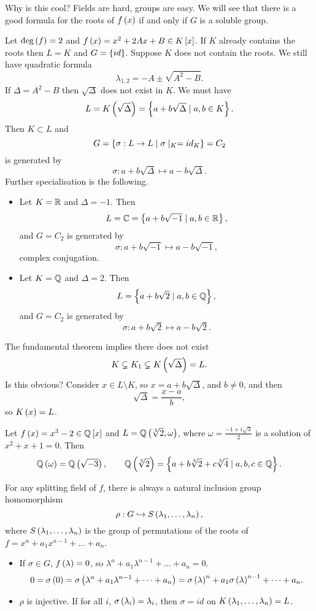 Why is this cool? Fields are hard, groups are easy. We will see that there is a good formula for the roots of $ f\left( x \right) $ if and only if $ G $ is a soluble group.


\begin{example*}
Let $ \deg\left( f \right) = 2 $ and $ f\left( x \right) = x^2 + 2Ax + B \in K\left[ x \right] $. If $ K $ already contains the roots then $ L = K $ and $ G = \left\{ id \right\} $. Suppose $ K $ does not contain the roots. We still have quadratic formula
$$ \lambda_{1, 2} = -A \pm \sqrt{A^2 - B}. $$
If $ \Delta = A^2 - B $ then $ \sqrt{\Delta} $ does not exist in $ K $. We must have
$$ L = K\left( \sqrt{\Delta} \right) = \left\{ a + b\sqrt{\Delta} \mid a, b \in K \right\}. $$
Then $ K \subset L $ and
$$ G = \left\{ \sigma : L \to L \mid \sigma \mid_K = id_K \right\} = C_2 $$
is generated by
$$ \sigma : a + b\sqrt{\Delta} \mapsto a - b\sqrt{\Delta}. $$
Further specialisation is the following.
\begin{itemize}
\item Let $ K = \mathbb{R} $ and $ \Delta = -1 $. Then
$$ L = \mathbb{C} = \left\{ a + b\sqrt{-1} \mid a, b \in \mathbb{R} \right\}, $$
and $ G = C_2 $ is generated by
$$ \sigma : a + b\sqrt{-1} \mapsto a - b\sqrt{-1}, $$
complex conjugation.
\item Let $ K = \mathbb{Q} $ and $ \Delta = 2 $. Then
$$ L = \left\{ a + b\sqrt{2} \mid a, b \in \mathbb{Q} \right\}, $$
and $ G = C_2 $ is generated by
$$ \sigma : a + b\sqrt{2} \mapsto a - b\sqrt{2}. $$
\end{itemize}
The fundamental theorem implies there does not exist
$$ K \subsetneq K_1 \subsetneq K\left( \sqrt{\Delta} \right) = L. $$
Is this obvious? Consider $ x \in L \setminus K $, so $ x = a + b\sqrt{\Delta} $, and $ b \ne 0 $, and then
$$ \sqrt{\Delta} = \dfrac{x - a}{b}, $$
so $ K\left( x \right) = L $.
\end{example*}

\begin{example*}
Let $ f\left( x \right) = x^3 - 2 \in \mathbb{Q}\left[ x \right] $ and $ L = \mathbb{Q}\left( \sqrt[3]{2}, \omega \right) $, where $ \omega = \tfrac{-1 + i\sqrt{3}}{2} $ is a solution of $ x^2 + x + 1 = 0 $. Then
$$ \mathbb{Q}\left( \omega \right) = \mathbb{Q}\left( \sqrt{-3} \right), \qquad \mathbb{Q}\left( \sqrt[3]{2} \right) = \left\{ a + b\sqrt[3]{2} + c\sqrt[3]{4} \mid a, b, c \in \mathbb{Q} \right\}. $$
\end{example*}

\begin{remark*}
For any splitting field of $ f $, there is always a natural inclusion group homomorphism
$$ \rho : G \hookrightarrow S\left( \lambda_1, \dots, \lambda_n \right), $$
where $ S\left( \lambda_1, \dots, \lambda_n \right) $ is the group of permutations of the roots of $ f = x^n + a_1x^{n - 1} + \dots + a_n $.
\begin{itemize}
\item If $ \sigma \in G $, $ f\left( \lambda \right) = 0 $, so $ \lambda^n + a_1\lambda^{n - 1} + \dots + a_n = 0 $.
$$ 0 = \sigma\left( 0 \right) = \sigma\left( \lambda^n + a_1\lambda^{n - 1} + \dots + a_n \right) = \sigma\left( \lambda \right)^n + a_1\sigma\left( \lambda \right)^{n - 1} + \dots + a_n. $$
\item $ \rho $ is injective. If for all $ i $, $ \sigma\left( \lambda_i \right) = \lambda_i $, then $ \sigma = id $ on $ K\left( \lambda_1, \dots, \lambda_n \right) = L $.
\end{itemize}
\end{remark*}


